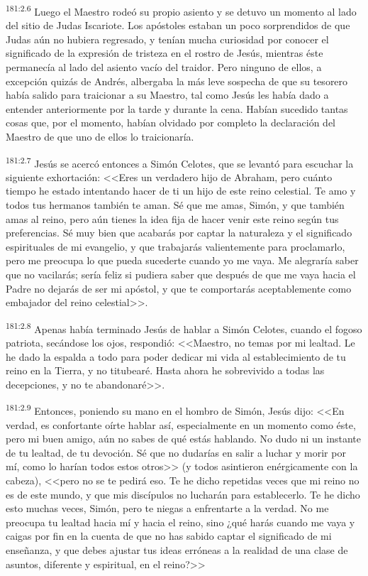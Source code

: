 \par 
\textsuperscript{181:2.6} Luego el Maestro rodeó su propio asiento y se detuvo un momento al lado del sitio de Judas Iscariote. Los apóstoles estaban un poco sorprendidos de que Judas aún no hubiera regresado, y tenían mucha curiosidad por conocer el significado de la expresión de tristeza en el rostro de Jesús, mientras éste permanecía al lado del asiento vacío del traidor. Pero ninguno de ellos, a excepción quizás de Andrés, albergaba la más leve sospecha de que su tesorero había salido para traicionar a su Maestro, tal como Jesús les había dado a entender anteriormente por la tarde y durante la cena. Habían sucedido tantas cosas que, por el momento, habían olvidado por completo la declaración del Maestro de que uno de ellos lo traicionaría.

\par 
\textsuperscript{181:2.7} Jesús se acercó entonces a Simón Celotes, que se levantó para escuchar la siguiente exhortación: <<Eres un verdadero hijo de Abraham, pero cuánto tiempo he estado intentando hacer de ti un hijo de este reino celestial. Te amo y todos tus hermanos también te aman. Sé que me amas, Simón, y que también amas al reino, pero aún tienes la idea fija de hacer venir este reino según tus preferencias. Sé muy bien que acabarás por captar la naturaleza y el significado espirituales de mi evangelio, y que trabajarás valientemente para proclamarlo, pero me preocupa lo que pueda sucederte cuando yo me vaya. Me alegraría saber que no vacilarás; sería feliz si pudiera saber que después de que me vaya hacia el Padre no dejarás de ser mi apóstol, y que te comportarás aceptablemente como embajador del reino celestial>>.

\par 
\textsuperscript{181:2.8} Apenas había terminado Jesús de hablar a Simón Celotes, cuando el fogoso patriota, secándose los ojos, respondió: <<Maestro, no temas por mi lealtad. Le he dado la espalda a todo para poder dedicar mi vida al establecimiento de tu reino en la Tierra, y no titubearé. Hasta ahora he sobrevivido a todas las decepciones, y no te abandonaré>>.

\par 
\textsuperscript{181:2.9} Entonces, poniendo su mano en el hombro de Simón, Jesús dijo: <<En verdad, es confortante oírte hablar así, especialmente en un momento como éste, pero mi buen amigo, aún no sabes de qué estás hablando. No dudo ni un instante de tu lealtad, de tu devoción. Sé que no dudarías en salir a luchar y morir por mí, como lo harían todos estos otros>> (y todos asintieron enérgicamente con la cabeza), <<pero no se te pedirá eso. Te he dicho repetidas veces que mi reino no es de este mundo, y que mis discípulos no lucharán para establecerlo. Te he dicho esto muchas veces, Simón, pero te niegas a enfrentarte a la verdad. No me preocupa tu lealtad hacia mí y hacia el reino, sino ¿qué harás cuando me vaya y caigas por fin en la cuenta de que no has sabido captar el significado de mi enseñanza, y que debes ajustar tus ideas erróneas a la realidad de una clase de asuntos, diferente y espiritual, en el reino?>>

